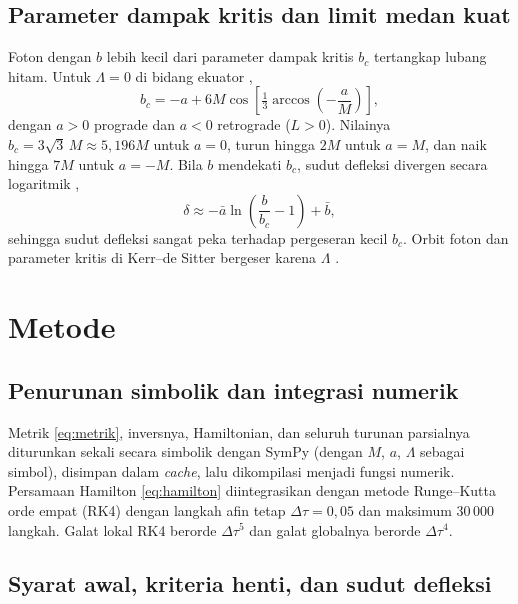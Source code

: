 \documentclass[11pt,a4paper]{article}
\begin{document}
\subsection{Parameter dampak kritis dan limit medan kuat}

Foton dengan $b$ lebih kecil dari parameter dampak kritis $b_c$ tertangkap lubang hitam. Untuk
$\Lambda = 0$ di bidang ekuator \citep[Pers.~17]{congdon2022asymmetric},
\begin{equation}
  b_c = -a + 6M\cos\!\left[\tfrac13\arccos\!\left(-\frac{a}{M}\right)\right],
  \label{eq:bc}
\end{equation}
dengan $a > 0$ prograde dan $a < 0$ retrograde ($L > 0$). Nilainya $b_c = 3\sqrt3\,M \approx 5{,}196M$
untuk $a = 0$, turun hingga $2M$ untuk $a = M$, dan naik hingga $7M$ untuk $a = -M$. Bila $b$ mendekati
$b_c$, sudut defleksi divergen secara logaritmik \citep{bozza2002gravitational},
\begin{equation}
  \delta \approx -\bar a \ln\!\left(\frac{b}{b_c} - 1\right) + \bar b,
\end{equation}
sehingga sudut defleksi sangat peka terhadap pergeseran kecil $b_c$. Orbit foton dan parameter kritis di
Kerr--de Sitter bergeser karena $\Lambda$ \citep{afrin2022estimating,omwoyo2023black}.

\section{Metode}

\subsection{Penurunan simbolik dan integrasi numerik}

Metrik \eqref{eq:metrik}, inversnya, Hamiltonian, dan seluruh turunan parsialnya diturunkan sekali secara
simbolik dengan SymPy (dengan $M$, $a$, $\Lambda$ sebagai simbol), disimpan dalam \emph{cache}, lalu
dikompilasi menjadi fungsi numerik. Persamaan Hamilton \eqref{eq:hamilton} diintegrasikan dengan metode
Runge--Kutta orde empat (RK4) \citep{enkekes2022metode,side2022numerical} dengan langkah afin tetap
$\Delta\tau = 0{,}05$ dan maksimum 30\,000 langkah. Galat lokal RK4 berorde $\Delta\tau^5$ dan galat globalnya
berorde $\Delta\tau^4$.

\subsection{Syarat awal, kriteria henti, dan sudut defleksi}
\end{document}
